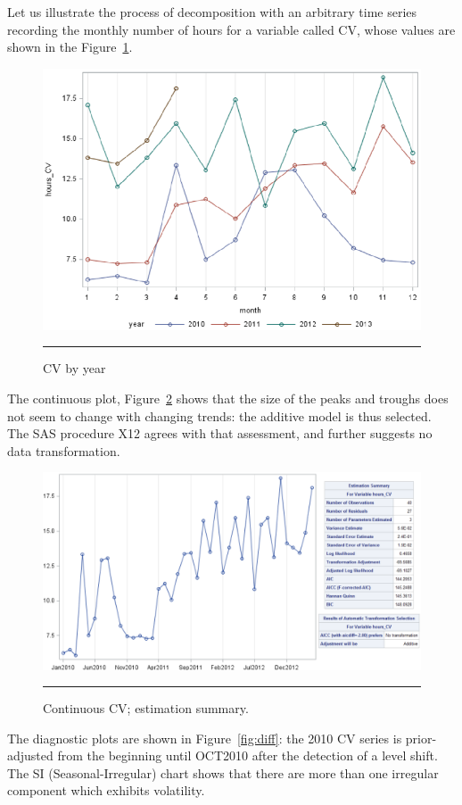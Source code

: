 Let us illustrate the process of decomposition with an arbitrary time series recording the monthly number of hours for a variable called CV, whose values are shown in the Figure~\ref{fig:cv}. 
\begin{figure}[t]
\centering
\includegraphics[width=\textwidth]{images/TS/CV_by_year-timeseries.png}
\caption{CV by year}\hrule
\label{fig:cv}
\end{figure}
The continuous plot, Figure~\ref{fig:cv_cont} shows that the size of the peaks and troughs does not seem to change with changing trends: the additive model is thus selected. The SAS procedure X12 agrees with that assessment, and further suggests no data transformation.
\begin{figure}[t]
\centering
\includegraphics[width=\textwidth]{images/TS/CV_continuously.png}
\caption{Continuous CV; estimation summary.}\hrule
\label{fig:cv_cont}
\end{figure}
The diagnostic plots are shown in Figure~\ref{fig:diff}: the 2010 CV series is prior-adjusted from the beginning until OCT2010 after the detection of a level shift. The SI (Seasonal-Irregular) chart shows that there are more than one irregular component which exhibits volatility.
